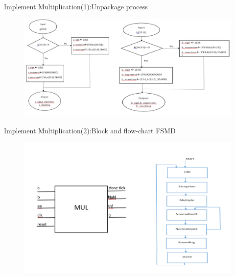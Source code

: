 \documentclass[11pt]{beamer}
\begin{document}
\begin{frame}[t]{Implement Multiplication(1):Unpackage process}
\begin{center}
    \begin{figure}[htp]
    \begin{center}
     \includegraphics[scale=.37]{image/fig15}
    \end{center}
    \label{reffig15}
    \end{figure}
\end{center}
\end{frame}
\begin{frame}[t]{Implement Multiplication(2):Block and flow-chart FSMD}
\begin{center}
    \begin{figure}[htp]
    \begin{center}
     \includegraphics[scale=.4]{image/fig14}
    \end{center}
    \label{reffig14}
    \end{figure}
\end{center}
\end{frame}
\end{document}
